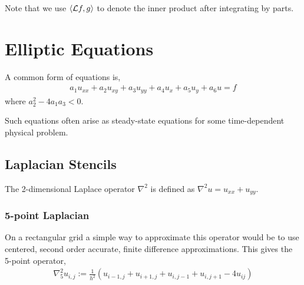 \documentclass[12pt]{article}
\begin{document}
Note that we use \( \left\langle \mathcal{L} f, g \right\rangle \) to denote the inner product after integrating by parts.


\section{Elliptic Equations}

A common form of equations is,
\begin{align*}
    a_1 u_{xx} + a_2u_{xy} + a_3u_{yy} + a_4 u_x + a_5 u_y + a_6 u = f
\end{align*}
where \( a_2^2 - 4a_1a_3 < 0 \).

Such equations often arise as steady-state equations for some time-dependent physical problem.

\subsection{Laplacian Stencils}
The 2-dimensional Laplace operator \( \nabla^2 \) is defined as \( \nabla^2 u = u_{xx} + u_{yy} \).

\subsubsection{5-point Laplacian}
On a rectangular grid a simple way to approximate this operator would be to use centered, second order accurate, finite difference approximations. This gives the 5-point operator,
\begin{align*}
    \nabla_5^2 u_{i,j} := \frac{1}{h^2} (u_{i-1,j}+u_{i+1,j}+u_{i,j-1}+u_{i,j+1}-4u_{ij})
\end{align*}
\end{document}
